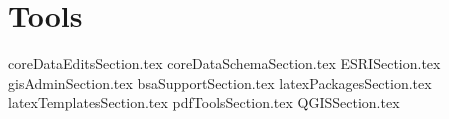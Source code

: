 %

\chapter{Tools}
{coreDataEditsSection.tex}
\clearpage
{coreDataSchemaSection.tex}
\clearpage
{ESRISection.tex}
\clearpage
{gisAdminSection.tex}
\clearpage
{bsaSupportSection.tex}
\clearpage
{latexPackagesSection.tex}
\clearpage
{latexTemplatesSection.tex}
\clearpage
{pdfToolsSection.tex}
\clearpage
{QGISSection.tex}

